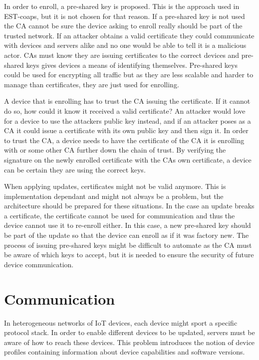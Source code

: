 \documentclass[0-thesis.tex]{subfiles}
\begin{document}
In order to enroll, a pre-shared key is proposed. This is the approach used in EST-coaps,
but it is not chosen for that reason. If a pre-shared key is not used the CA cannot be
sure the device asking to enroll really should be part of the trusted network. If an
attacker obtains a valid certificate they could communicate with devices and servers alike
and no one would be able to tell it is a malicious actor. CAs must know they are issuing
certificates to the correct devices and pre-shared keys gives devices a means of
identifying themselves. Pre-shared keys could be used for encrypting all traffic but as
they are less scalable and harder to manage than certificates, they are just used for
enrolling.

A device that is enrolling has to trust the CA issuing the certificate. If it cannot do
so, how could it know it received a valid certificate? An attacker would love for a device
to use the attackers public key instead, and if an attacker poses as a CA it could issue a
certificate with its own public key and then sign it. In order to trust the CA, a device
needs to have the certificate of the CA it is enrolling with or some other CA further down
the chain of trust. By verifying the signature on the newly enrolled certificate with the
CAs own certificate, a device can be certain they are using the correct keys.

When applying updates, certificates might not be valid anymore. This is implementation
dependant and might not always be a problem, but the architecture should be prepared for
these situations. In the case an update breaks a certificate, the certificate cannot be
used for communication and thus the device cannot use it to re-enroll either. In this
case, a new pre-shared key should be part of the update so that the device can enroll as
if it was factory new. The process of issuing pre-shared keys might be difficult to
automate as the CA must be aware of which keys to accept, but it is needed to ensure the
security of future device communication.

\section{Communication}
\label{sec:communication}
In heterogeneous networks of IoT devices, each device might sport a specific protocol
stack. In order to enable different devices to be updated, servers must be aware of how to
reach these devices. This problem introduces the notion of device profiles containing
information about device capabilities and software versions. 
\end{document}
